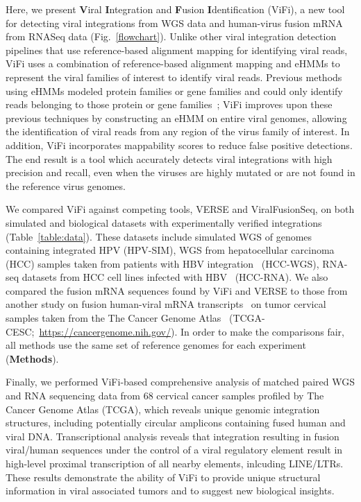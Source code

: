 \documentclass[a4,center,fleqn]{NAR}
\begin{document}
 Here, we present \textbf{V}iral \textbf{I}ntegration and
\textbf{F}usion \textbf{I}dentification (ViFi), a new tool for
detecting viral integrations from WGS data and human-virus fusion mRNA
from RNASeq data (Fig.~\ref{flowchart}).  Unlike other viral
integration detection pipelines that use reference-based alignment
mapping for identifying viral reads, ViFi uses a combination of
reference-based alignment mapping and eHMMs to represent the viral
families of interest to identify viral reads.  Previous methods using eHMMs 
modeled protein families or gene families and could only identify reads
belonging to those protein or gene families~\cite{Nguyen2014,Nguyen2016_hippi};
ViFi improves upon these previous techniques by constructing an eHMM
on entire viral genomes, allowing the identification of viral reads from any region of 
the virus family of interest.  In addition, ViFi
incorporates mappability scores to reduce false positive detections.
The end result is a tool which accurately detects viral integrations
with high precision and recall, even when the viruses are highly
mutated or are not found in the reference virus genomes.

We compared ViFi against competing tools, VERSE and ViralFusionSeq, on
both simulated and biological datasets with experimentally verified
integrations (Table~\ref{table:data}).  These 
datasets include simulated WGS of genomes
containing integrated HPV (HPV-SIM), WGS from hepatocellular carcinoma (HCC) samples taken from
patients with HBV integration~\cite{Sung2012} (HCC-WGS), RNA-seq
datasets from HCC cell lines infected with HBV~\cite{Lau2014}
(HCC-RNA).  We also compared the fusion mRNA sequences found by ViFi
and VERSE to those from another study on fusion human-viral mRNA
transcripts~\cite{Tang2013} on tumor cervical samples taken from the
The Cancer Genome Atlas~\cite{TCGA} (TCGA-CESC;~\url{https://cancergenome.nih.gov/}).  In order to make the comparisons fair, all methods use the same set of reference genomes for each experiment (\textbf{Methods}). 

Finally, we performed ViFi-based comprehensive analysis of matched paired WGS and RNA sequencing data from 68 cervical cancer samples profiled by The Cancer Genome Atlas (TCGA), which reveals unique genomic integration structures, including potentially circular amplicons containing fused human and viral DNA.  Transcriptional analysis reveals that integration resulting in fusion viral/human sequences under the control of a viral regulatory element result in high-level proximal transcription of all nearby elements, inlcuding LINE/LTRs. These results demonstrate the ability of ViFi to provide unique structural information in viral associated tumors and to suggest new biological insights.
\end{document}
